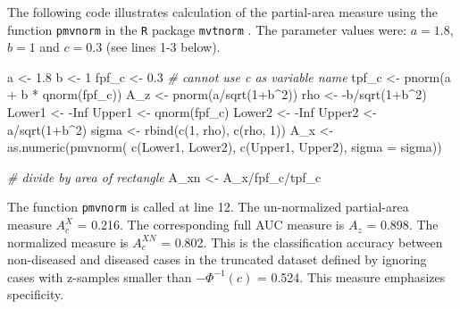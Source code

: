 \documentclass[
]{book}
\newenvironment{Shaded}{\begin{snugshade}}{\end{snugshade}}
\newcommand{\AttributeTok}[1]{\textcolor[rgb]{0.77,0.63,0.00}{#1}}
\newcommand{\CommentTok}[1]{\textcolor[rgb]{0.56,0.35,0.01}{\textit{#1}}}
\newcommand{\ConstantTok}[1]{\textcolor[rgb]{0.00,0.00,0.00}{#1}}
\newcommand{\DecValTok}[1]{\textcolor[rgb]{0.00,0.00,0.81}{#1}}
\newcommand{\FloatTok}[1]{\textcolor[rgb]{0.00,0.00,0.81}{#1}}
\newcommand{\FunctionTok}[1]{\textcolor[rgb]{0.00,0.00,0.00}{#1}}
\newcommand{\NormalTok}[1]{#1}
\newcommand{\OtherTok}[1]{\textcolor[rgb]{0.56,0.35,0.01}{#1}}
\newcommand{\SpecialCharTok}[1]{\textcolor[rgb]{0.00,0.00,0.00}{#1}}
\begin{document}
The following code illustrates calculation of the partial-area measure using the function \texttt{pmvnorm} in the \texttt{R} package \texttt{mvtnorm} \citep{R-mvtnorm}. The parameter values were: \(a = 1.8\), \(b = 1\) and \(c = 0.3\) (see lines 1-3 below).

\begin{Shaded}
\begin{Highlighting}[numbers=left,,]
\NormalTok{a }\OtherTok{\textless{}{-}} \FloatTok{1.8}
\NormalTok{b }\OtherTok{\textless{}{-}} \DecValTok{1}
\NormalTok{fpf\_c }\OtherTok{\textless{}{-}} \FloatTok{0.3} \CommentTok{\# cannot use c as variable name}
\NormalTok{tpf\_c }\OtherTok{\textless{}{-}} \FunctionTok{pnorm}\NormalTok{(a }\SpecialCharTok{+}\NormalTok{ b }\SpecialCharTok{*} \FunctionTok{qnorm}\NormalTok{(fpf\_c))}
\NormalTok{A\_z }\OtherTok{\textless{}{-}} \FunctionTok{pnorm}\NormalTok{(a}\SpecialCharTok{/}\FunctionTok{sqrt}\NormalTok{(}\DecValTok{1}\SpecialCharTok{+}\NormalTok{b}\SpecialCharTok{\^{}}\DecValTok{2}\NormalTok{))}
\NormalTok{rho }\OtherTok{\textless{}{-}} \SpecialCharTok{{-}}\NormalTok{b}\SpecialCharTok{/}\FunctionTok{sqrt}\NormalTok{(}\DecValTok{1}\SpecialCharTok{+}\NormalTok{b}\SpecialCharTok{\^{}}\DecValTok{2}\NormalTok{)}
\NormalTok{Lower1 }\OtherTok{\textless{}{-}} \SpecialCharTok{{-}}\ConstantTok{Inf}
\NormalTok{Upper1 }\OtherTok{\textless{}{-}} \FunctionTok{qnorm}\NormalTok{(fpf\_c)}
\NormalTok{Lower2 }\OtherTok{\textless{}{-}} \SpecialCharTok{{-}}\ConstantTok{Inf}
\NormalTok{Upper2 }\OtherTok{\textless{}{-}}\NormalTok{ a}\SpecialCharTok{/}\FunctionTok{sqrt}\NormalTok{(}\DecValTok{1}\SpecialCharTok{+}\NormalTok{b}\SpecialCharTok{\^{}}\DecValTok{2}\NormalTok{)}
\NormalTok{sigma }\OtherTok{\textless{}{-}} \FunctionTok{rbind}\NormalTok{(}\FunctionTok{c}\NormalTok{(}\DecValTok{1}\NormalTok{, rho), }\FunctionTok{c}\NormalTok{(rho, }\DecValTok{1}\NormalTok{))}
\NormalTok{A\_x }\OtherTok{\textless{}{-}} \FunctionTok{as.numeric}\NormalTok{(}\FunctionTok{pmvnorm}\NormalTok{(}
  \FunctionTok{c}\NormalTok{(Lower1, Lower2), }
  \FunctionTok{c}\NormalTok{(Upper1, Upper2), }
  \AttributeTok{sigma =}\NormalTok{ sigma))}

\CommentTok{\# divide by area of rectangle}
\NormalTok{A\_xn }\OtherTok{\textless{}{-}}\NormalTok{ A\_x}\SpecialCharTok{/}\NormalTok{fpf\_c}\SpecialCharTok{/}\NormalTok{tpf\_c}
\end{Highlighting}
\end{Shaded}

The function \texttt{pmvnorm} is called at line 12. The un-normalized partial-area measure \(A_c^{X}\) = 0.216. The corresponding full AUC measure is \(A_z\) = 0.898. The normalized measure is \(A_c^{XN}\) = 0.802. This is the classification accuracy between non-diseased and diseased cases in the truncated dataset defined by ignoring cases with z-samples smaller than \(-\Phi^{-1}(c)\) = 0.524. This measure emphasizes specificity.
\end{document}
